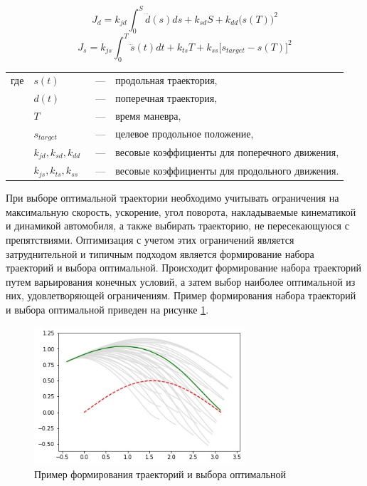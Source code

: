\begin{equation}
    \label{eq:cost_lat}
    J_d = k_{jd}\int_0^S{\dddot{d}(s)ds} + k_{sd}S + k_{dd}\big(s(T)\big)^2
\end{equation}
\begin{equation}
    \label{eq:cost_lon}
    J_s = k_{js}\int_0^T{\dddot{s}(t)dt} + k_{ts}T + k_{ss}\big[s_{target} - s(T)\big]^2
\end{equation}

\noindent\begin{tabularx}{\linewidth}{lllX}
    где & $s(t)$         &~---& продольная траектория, \\
        & $d(t)$         &~---& поперечная траектория, \\
        & $T$            &~---& время маневра, \\
        & $s_{target}$   &~---& целевое продольное положение, \\
        & $k_{jd}, k_{sd}, k_{dd}$ &~---& весовые коэффициенты для поперечного движения,\\
        & $k_{js}, k_{ts}, k_{ss}$ &~---& весовые коэффициенты для продольного движения.
\end{tabularx}

При выборе оптимальной траектории необходимо учитывать ограничения на максимальную скорость, ускорение,
угол поворота, накладываемые кинематикой и динамикой автомобиля, а также выбирать траекторию, не
пересекающуюся с препятствиями. Оптимизация с учетом этих ограничений является затруднительной и
типичным подходом является формирование набора траекторий и выбора оптимальной. Происходит формирование
набора траекторий путем варьирования конечных условий, а затем выбор наиболее оптимальной из них,
удовлетворяющей ограничениям. Пример формирования набора траекторий и выбора оптимальной приведен на
рисунке \ref{img:trajectory_planning_example}.

\begin{figure}[h]
    \centering
    \includegraphics[width=0.7\textwidth]{images/trajectory_planning_example}
    \caption{Пример формирования траекторий и выбора оптимальной}
    \label{img:trajectory_planning_example}
\end{figure}

